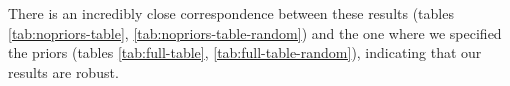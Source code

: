 \documentclass[11pt,]{article}
\begin{document}
There is an incredibly close correspondence between these results
(tables \ref{tab:nopriors-table}, \ref{tab:nopriors-table-random}) and
the one where we specified the priors (tables \ref{tab:full-table},
\ref{tab:full-table-random}), indicating that our results are robust.


\end{document}
